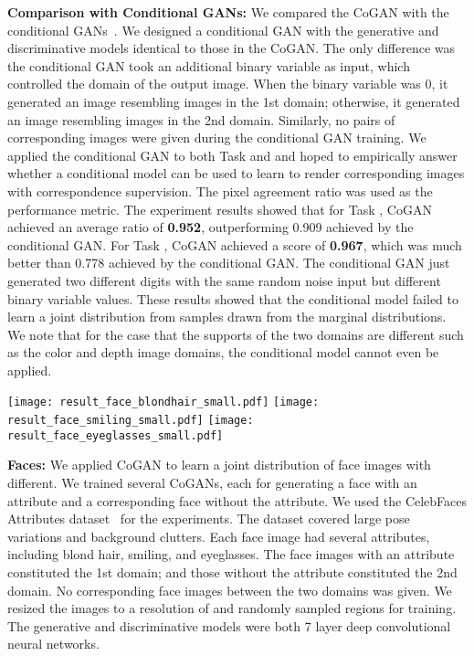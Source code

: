 \documentclass{article}
\begin{document}
{\bf Comparison with Conditional GANs:} We compared the CoGAN with the conditional GANs~\cite{mirza2014conditional}. We designed a conditional GAN with the generative and discriminative models identical to those in the CoGAN. The only difference was the conditional GAN took an additional binary variable as input, which controlled the domain of the output image. When the binary variable was 0, it generated an image resembling images in the 1st domain; otherwise, it generated an image resembling images in the 2nd domain. Similarly, no pairs of corresponding images were given during the conditional GAN training. We applied the conditional GAN to both Task   and  and hoped to empirically answer whether a conditional model can be used to learn to render corresponding images with correspondence supervision. The pixel agreement ratio was used as the performance metric. The experiment results showed that for Task , CoGAN achieved an average ratio of {\bf 0.952}, outperforming 0.909 achieved by the conditional GAN. For Task , CoGAN achieved a score of {\bf 0.967}, which was much better than 0.778 achieved by the conditional GAN. The conditional GAN just generated two different digits with the same random noise input but different binary variable values. These results showed that the conditional model failed to learn a joint distribution from samples drawn from the marginal distributions. We note that for the case that the supports of the two domains are different such as the color and depth image domains, the conditional model cannot even be applied. 

\begin{figure*}[thb!]
\centering
\texttt{[image: result\_face\_blondhair\_small.pdf]}
\texttt{[image: result\_face\_smiling\_small.pdf]}
\texttt{[image: result\_face\_eyeglasses\_small.pdf]}
\caption{\small Generation of face images with different attributes using CoGAN. From top to bottom, the figure shows pair face generation results for the blond-hair, smiling, and eyeglasses attributes. For each pair, the 1st row contains faces with the attribute, while the 2nd row contains corresponding faces without the attribute.}
\label{fig::result_attr_faces}
\vspace{-2mm}
\end{figure*}

{\bf Faces:} We applied CoGAN to learn a joint distribution of face images with different. We trained several CoGANs, each for generating a face with an attribute and a corresponding face without the attribute. We used the CelebFaces Attributes dataset~\cite{liu2015deep} for the experiments. The dataset covered large pose variations and background clutters. Each face image had several attributes, including blond hair, smiling, and eyeglasses. The face images with an attribute constituted the 1st domain; and those without the attribute constituted the 2nd domain. No corresponding face images between the two domains was given. We resized the images to a resolution of  and randomly sampled  regions for training. The generative and discriminative models were both 7 layer deep convolutional neural networks. 
\end{document}
